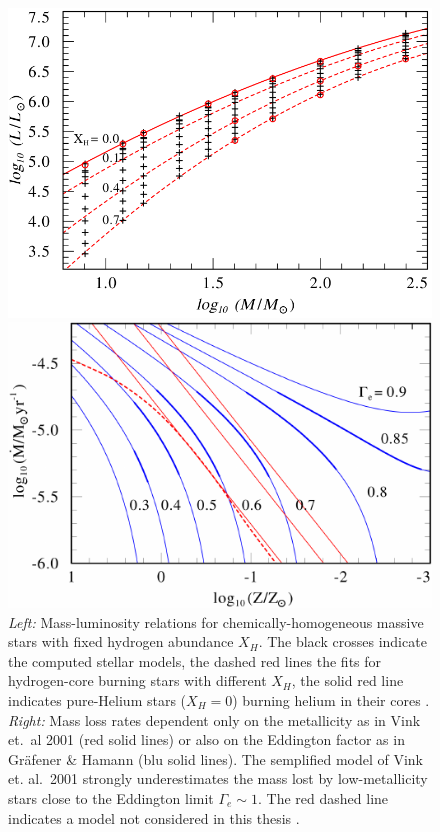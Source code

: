 \documentclass[a4paper,titlepage]{book}     	%
\begin{document}
 
\begin{figure}[h]
	\begin{minipage}{.49\textwidth}
		\centering
		\includegraphics[width=.94\textwidth]{./images/MLrelation.png}
	\end{minipage}
	\hfill
	\begin{minipage}{.49\textwidth}
		\centering
		\includegraphics[width=\textwidth]{./images/stellarwinds.pdf}	
	\end{minipage}
	\caption{\emph{Left:} Mass-luminosity relations for chemically-homogeneous massive stars with fixed hydrogen abundance $X_H$. The black crosses indicate the computed stellar models, the dashed red lines the fits for hydrogen-core burning stars with different $X_H$, the solid red line indicates pure-Helium stars ($X_H = 0$) burning helium in their cores \cite{Grafener2011_M-L_WR}. \emph{Right:} Mass loss rates dependent only on the metallicity as in Vink et.\ al 2001 \cite{Vink2001} (red solid lines) or also on the Eddington factor as in Gr{\"a}fener \& Hamann \cite{G&H_WRmassloss} (blu solid lines). The semplified model of Vink et. al.\ 2001 strongly underestimates the mass lost by low-metallicity stars close to the Eddington limit $\Gamma_e \sim 1$. The red dashed line indicates a model not considered in this thesis \cite{G&H_WRmassloss}.}\label{fig:MLandwinds}
\end{figure}
\end{document}
